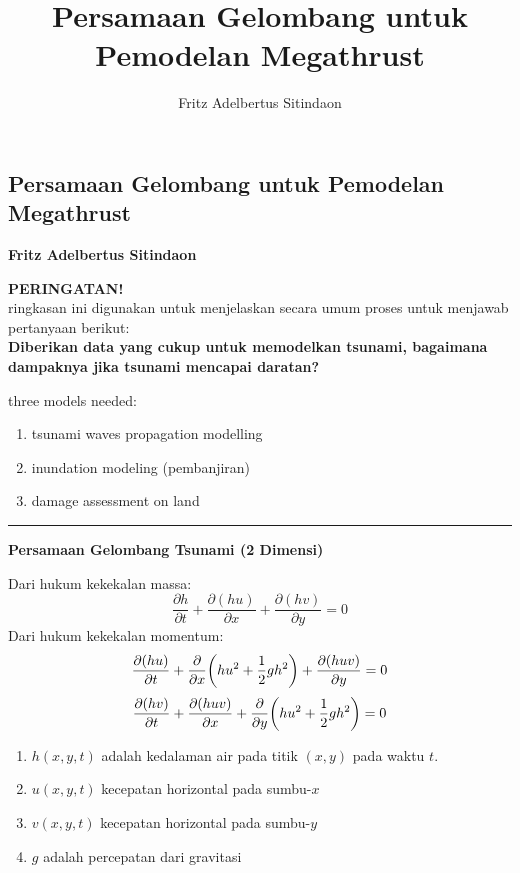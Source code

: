\documentclass{article}
\title{Persamaan Gelombang untuk Pemodelan Megathrust}
\author{Fritz Adelbertus Sitindaon}
\date{}
\begin{document}
\begin{flushright}
    \section*{Persamaan Gelombang untuk Pemodelan Megathrust}
    \textbf{Fritz Adelbertus Sitindaon}
\end{flushright}
\textbf{PERINGATAN!}\\
ringkasan ini digunakan untuk menjelaskan secara umum proses untuk menjawab pertanyaan berikut:\\
\textbf{Diberikan data yang cukup untuk memodelkan tsunami, bagaimana dampaknya jika tsunami mencapai daratan?}

three models needed:
\begin{enumerate}
    \item tsunami waves propagation modelling
    \item inundation modeling (pembanjiran)
    \item damage assessment on land
\end{enumerate}

\vspace{0.5cm}\hrule height 2pt\vspace{0.5cm}

\begin{center}
    \textbf{Persamaan Gelombang Tsunami (2 Dimensi)}
\end{center}
Dari hukum kekekalan massa:
\[
\frac{\partial h}{\partial t} + \frac{\partial (hu)}{\partial x} + \frac{\partial (hv)}{\partial y} = 0
\]
Dari hukum kekekalan momentum:
\[
\frac{\partial (hu)}{\partial t} + \frac{\partial}{\partial x} \oio*{hu^2+\frac{1}{2}gh^2} + \frac{\partial (huv)}{\partial y} = 0
\]
\[
\frac{\partial (hv)}{\partial t} + \frac{\partial (huv)}{\partial x} + \frac{\partial}{\partial y} \oio*{hu^2+\frac{1}{2}gh^2} = 0
\]
\begin{enumerate}
    \item $h(x,y,t)$ adalah kedalaman air pada titik $(x,y)$ pada waktu $t$.
    \item $u(x,y,t)$ kecepatan horizontal pada sumbu-$x$
    \item $v(x,y,t)$ kecepatan horizontal pada sumbu-$y$
    \item $g$ adalah percepatan dari gravitasi
\end{enumerate}
\end{document}
